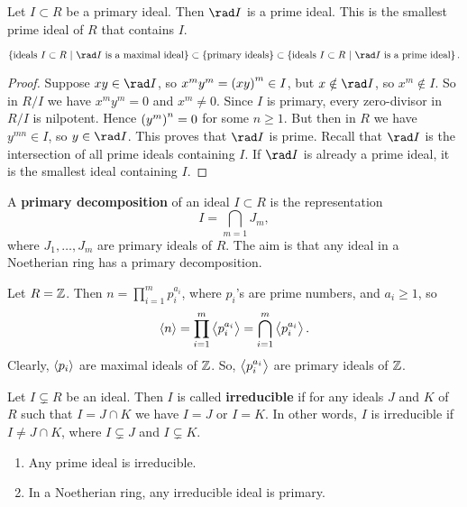 \begin{proposition}
Let $ I \subset R $ be a primary ideal. Then $ \rad I $ is a prime ideal. This is the smallest prime ideal of $ R $ that contains $ I $.
\end{proposition}

\begin{remark*}
$$ \cbr{\text{ideals} \ I \subset R \st \rad I \ \text{is a maximal ideal}} \subset \cbr{\text{primary ideals}} \subset \cbr{\text{ideals} \ I \subset R \st \rad I \ \text{is a prime ideal}}. $$
\end{remark*}

\begin{proof}
Suppose $ xy \in \rad I $, so $ x^my^m = \br{xy}^m \in I $, but $ x \notin \rad I $, so $ x^m \notin I $. So in $ R / I $ we have $ x^my^m = 0 $ and $ x^m \ne 0 $. Since $ I $ is primary, every zero-divisor in $ R / I $ is nilpotent. Hence $ \br{y^m}^n = 0 $ for some $ n \ge 1 $. But then in $ R $ we have $ y^{mn} \in I $, so $ y \in \rad I $. This proves that $ \rad I $ is prime. Recall that $ \rad I $ is the intersection of all prime ideals containing $ I $. If $ \rad I $ is already a prime ideal, it is the smallest ideal containing $ I $.
\end{proof}

A \textbf{primary decomposition} of an ideal $ I \subset R $ is the representation
$$ I = \bigcap_{m = 1} J_m, $$
where $ J_1, \dots, J_m $ are primary ideals of $ R $. The aim is that any ideal in a Noetherian ring has a primary decomposition.

\begin{example*}
Let $ R = \mathbb{Z} $. Then $ n = \prod_{i = 1}^m p_i^{a_i} $, where $ p_i $'s are prime numbers, and $ a_i \ge 1 $, so
$$ \left\langle n \right\rangle = \prod_{i = 1}^m \left\langle p_i^{a_i} \right\rangle = \bigcap_{i = 1}^m \left\langle p_i^{a_i} \right\rangle. $$
Clearly, $ \left\langle p_i \right\rangle $ are maximal ideals of $ \mathbb{Z} $. So, $ \left\langle p_i^{a_i} \right\rangle $ are primary ideals of $ \mathbb{Z} $.
\end{example*}

\begin{definition}
Let $ I \subsetneq R $ be an ideal. Then $ I $ is called \textbf{irreducible} if for any ideals $ J $ and $ K $ of $ R $ such that $ I = J \cap K $ we have $ I = J $ or $ I = K $. In other words, $ I $ is irreducible if $ I \ne J \cap K $, where $ I \subsetneq J $ and $ I \subsetneq K $.
\end{definition}

\begin{proposition}
\hfill
\begin{enumerate}
\item Any prime ideal is irreducible.
\item In a Noetherian ring, any irreducible ideal is primary.
\end{enumerate}
\end{proposition}

